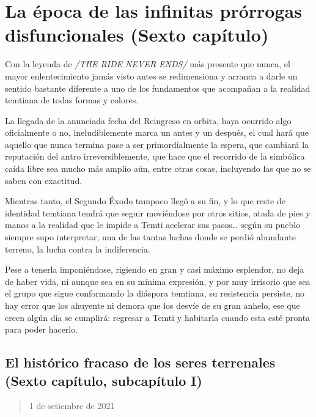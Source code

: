 \documentclass[
  spanish,
]{book}
\begin{document}
\hypertarget{la-uxe9poca-de-las-infinitas-pruxf3rrogas-disfuncionales-sexto-capuxedtulo}{%
\chapter{La época de las infinitas prórrogas disfuncionales (Sexto capítulo)}\label{la-uxe9poca-de-las-infinitas-pruxf3rrogas-disfuncionales-sexto-capuxedtulo}}

Con la leyenda de \emph{/THE RIDE NEVER ENDS/} más presente que nunca, el mayor enlentecimiento jamás visto antes se redimensiona y arranca a darle un sentido bastante diferente a uno de los fundamentos que acompañan a la realidad temtiana de todas formas y colores.

La llegada de la anunciada fecha del Reingreso en orbita, haya ocurrido algo oficialmente o no, ineludiblemente marca un antes y un después, el cual hará que aquello que nunca termina pase a ser primordialmente la espera, que cambiará la reputación del antro irreversiblemente, que hace que el recorrido de la simbólica caída libre sea mucho más amplio aún, entre otras cosas, incluyendo las que no se saben con exactitud.

Mientras tanto, el Segundo Éxodo tampoco llegó a su fin, y lo que reste de identidad temtiana tendrá que seguir moviéndose por otros sitios, atada de pies y manos a la realidad que le impide a Temti acelerar sus pasos\ldots{} según su pueblo siempre supo interpretar, una de las tantas luchas donde se perdió abundante terreno, la lucha contra la indiferencia.

Pese a tenerla imponiéndose, rigiendo en gran y casi máximo esplendor, no deja de haber vida, ni aunque sea en su mínima expresión, y por muy irrisorio que sea el grupo que sigue conformando la diáspora temtiana, su resistencia persiste, no hay error que los ahuyente ni demora que los desvíe de su gran anhelo, ese que creen algún día se cumplirá: regresar a Temti y habitarla cuando esta esté pronta para poder hacerlo.

\hypertarget{el-histuxf3rico-fracaso-de-los-seres-terrenales-sexto-capuxedtulo-subcapuxedtulo-i}{%
\section{El histórico fracaso de los seres terrenales (Sexto capítulo, subcapítulo I)}\label{el-histuxf3rico-fracaso-de-los-seres-terrenales-sexto-capuxedtulo-subcapuxedtulo-i}}

\begin{quote}
1 de setiembre de 2021
\end{quote}
\end{document}
